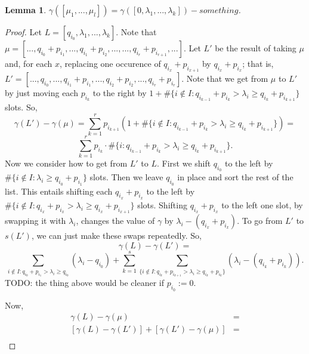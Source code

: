 \documentclass[12pt,psamsfonts]{article}
\newtheorem{lemma}[theorem]{Lemma}
\begin{document}
\begin{lemma}
    \(\gamma([\mu_1, ..., \mu_l]) = \gamma([0, \lambda_1, ..., \lambda_k]) - something\).
\end{lemma}
\begin{proof}
    Let \(L = [q_{i_0}, \lambda_1, ..., \lambda_k]\).
    Note that \(\mu = [..., q_{i_0} + p_{i_1}, ..., q_{i_1} + p_{i_2}, ..., ..., q_{i_r} + p_{i_{r + 1}}, ...]\).
    Let \(L'\) be the result of taking \(\mu\) and, for each \(x\), replacing one occurence of \(q_{i_x} + p_{i_{x + 1}}\) by \(q_{i_x} + p_{i_x}\); that is,
    \(L' = [..., q_{i_0}, ..., q_{i_1} + p_{i_1}, ..., q_{i_2} + p_{i_2}, ..., q_{i_r} + p_{i_r}]\).
    Note that we get from \(\mu\) to \(L'\) by just moving each \(p_{i_k}\) to the right by \(1 + \#\{i \notin I : q_{i_{k - 1}} + p_{i_k} > \lambda_i \geq q_{i_k} + p_{i_{k + 1}}\}\) slots.
    So,
    \[\gamma(L') - \gamma(\mu) = \sum_{k = 1}^r p_{i_{k + 1}} (1 + \#\{i \notin I : q_{i_{k - 1}} + p_{i_k} > \lambda_i \geq q_{i_k} + p_{i_{k + 1}}\}) = \]
    \[\sum_{k = 1}^r p_{i_k} \cdot \#\{i : q_{i_{k - 1}} + p_{i_k} > \lambda_i \geq q_{i_k} + p_{i_{k + 1}}\}.\]
    Now we consider how to get from \(L'\) to \(L\).
    First we shift \(q_{i_0}\) to the left by \(\#\{i \notin I : \lambda_i \geq q_{i_0} + p_{i_1}\}\) slots.
    Then we leave \(q_{i_0}\) in place and sort the rest of the list.
    This entails shifting each \(q_{i_x} + p_{i_x}\) to the left by \(\#\{i \notin I : q_{i_x} + p_{i_x} > \lambda_i \geq q_{i_x} + p_{i_{x + 1}}\}\) slots.
    Shifting \(q_{i_x} + p_{i_x}\) to the left one slot, by swapping it with \(\lambda_i\), changes the value of \(\gamma\) by \(\lambda_i - (q_{i_x} + p_{i_x})\).
    To go from \(L'\) to \(s(L')\), we can just make these swaps repeatedly.  
    So,
    \[\gamma(L) - \gamma(L') = \]
    \[\sum_{i \notin I : q_{i_0} + p_{i_1} > \lambda_i \geq q_{i_0}} (\lambda_i - q_{i_0}) + \sum_{k = 1}^s \sum_{\{i \notin I : q_{i_k} + p_{i_{k + 1}} > \lambda_i \geq q_{i_k} + p_{i_k}\}} (\lambda_i - (q_{i_k} + p_{i_k})).\]
    TODO: the thing above would be cleaner if \(p_{i_0} := 0\).
    \par Now,
    \begin{align*}
        \gamma(L) - \gamma(\mu) & = \\
        [\gamma(L) - \gamma(L')] + [\gamma(L') - \gamma(\mu)] & = \\
    \end{align*}    
\end{proof}
\end{document}
